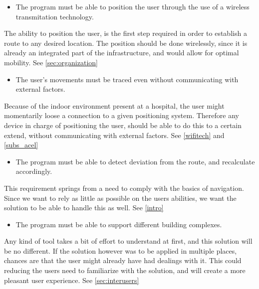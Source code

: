 \begin{itemize}
	\item The program must be able to position the user through the use of a wireless transmitation technology.
\end{itemize}
The ability to position the user, is the first step required in order to establish a route to any desired location. The position should be done wirelessly, since it is already an integrated part of the infrastructure, and would allow for optimal mobility. See \cref{sec:organization}

\begin{itemize}
	\item The user's movements must be traced even without communicating with external factors.
\end{itemize}
Because of the indoor environment present at a hospital, the user might momentarily loose a connection to a given positioning system. Therefore any device in charge of positioning the user, should be able to do this to a certain extend, without communicating with external factors. See \cref{wifitech} and \cref{subs_acel}

\begin{itemize}
	\item The program must be able to detect deviation from the route, and recalculate accordingly.
\end{itemize}
This requirement springs from a need to comply with the basics of navigation. Since we want to rely as little as possible on the users abilities, we want the solution to be able to handle this as well. See \cref{intro}

\begin{itemize}
	\item The program must be able to support different building complexes.
\end{itemize}
Any kind of tool takes a bit of effort to understand at first, and this solution will be no different. If the solution however was to be applied in multiple places, chances are that the user might already have had dealings with it. This could reducing the users need to familiarize with the solution, and will create a more pleasant user experience. See \cref{sec:interusers}

